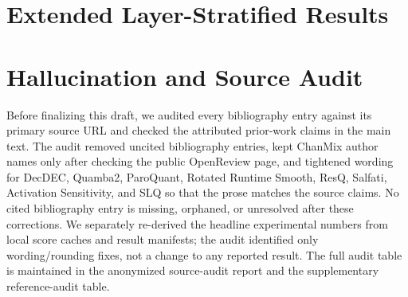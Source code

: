 \documentclass{article}
\begin{document}
\section{Extended Layer-Stratified Results}
\label{app:layer-details}

\begin{table}[h]
\centering
\small
{}
\caption{Layer-type decomposition. Strict set-leaving is the component most directly relevant to protected-set membership; within-set shuffling motivates scale-refresh mechanisms but is not itself membership loss.}
\end{table}

\section{Hallucination and Source Audit}
\label{app:hallucination-audit}

Before finalizing this draft, we audited every bibliography entry against its
primary source URL and checked the attributed prior-work claims in the main
text. The audit removed uncited bibliography entries, kept ChanMix author names
only after checking the public OpenReview page, and tightened wording for
DecDEC, Quamba2, ParoQuant, Rotated Runtime Smooth, ResQ, Salfati, Activation
Sensitivity, and SLQ so that the prose matches the source claims. No cited
bibliography entry is missing, orphaned, or unresolved after these corrections.
We separately re-derived the headline experimental numbers from local score
caches and result manifests; the audit identified only wording/rounding fixes,
not a change to any reported result. The full audit table is maintained in the
anonymized source-audit report and the supplementary reference-audit table.
\end{document}

